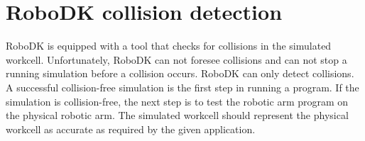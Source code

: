 \section{RoboDK collision detection}

RoboDK is equipped with a tool that checks for collisions in the simulated workcell. Unfortunately, RoboDK can not foresee collisions and can not stop a running simulation before a collision occurs. RoboDK can only detect collisions. A successful collision-free simulation  is the first step in running a program. If the simulation is collision-free, the next step is to test the robotic arm program on the physical robotic arm. The simulated workcell should represent the physical workcell as accurate as required by the given application. 

